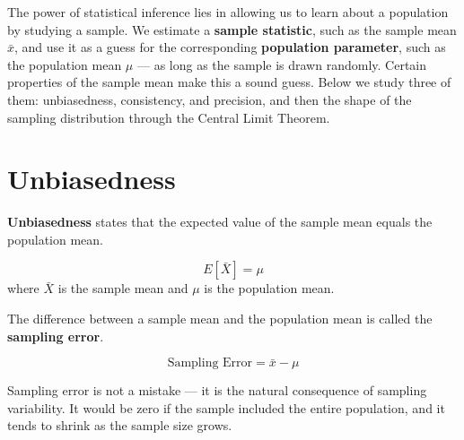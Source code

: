\documentclass[
  11pt,
  letterpaper,
  DIV=11,
  numbers=noendperiod,
  oneside,
  open=any]{scrreprt}
\begin{document}
The power of statistical inference lies in allowing us to learn about a
population by studying a sample. We estimate a \textbf{sample
statistic}, such as the sample mean \(\bar{x}\), and use it as a guess
for the corresponding \textbf{population parameter}, such as the
population mean \(\mu\) --- as long as the sample is drawn randomly.
Certain properties of the sample mean make this a sound guess. Below we
study three of them: unbiasedness, consistency, and precision, and then
the shape of the sampling distribution through the Central Limit
Theorem.

\section{Unbiasedness}\label{unbiasedness}

\textbf{Unbiasedness} states that the expected value of the sample mean
equals the population mean.

\begin{bsformula}[UNBIASEDNESS]

\[E[\bar{X}] = \mu\] where \(\bar{X}\) is the sample mean and \(\mu\) is
the population mean.

\end{bsformula}

The difference between a sample mean and the population mean is called
the \textbf{sampling error}.

\begin{bsformula}

\[\text{Sampling Error} = \bar{x} - \mu\]

\end{bsformula}

Sampling error is not a mistake --- it is the natural consequence of
sampling variability. It would be zero if the sample included the entire
population, and it tends to shrink as the sample size grows.
\end{document}
